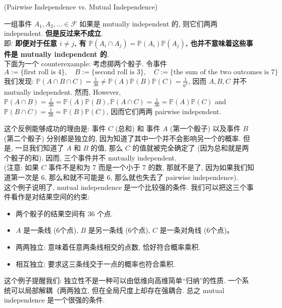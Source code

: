 \begin{example}{(Pairwise Independence vs. Mutual Independence)}

一组事件 $A_1, A_2, \ldots \in \mathcal{F}$ 如果是 mutually independent 的, 则它们两两 independent. \textbf{但是反过来不成立}.\\
即: \textbf{即便对于任意 $i \neq j$, 有 $\mathbb{P}(A_i \cap A_j) = \mathbb{P}(A_i) \mathbb{P}(A_j)$, 也并不意味着这些事件是 mutually independent 的}.\\
下面为一个 counterexample: 考虑掷两个骰子. 令事件
$$
A:=\{\text{first roll is } 4\}, \quad B:=\{\text{second roll is } 3\},\quad C:=\{\text{the sum of the two outcomes is } 7\}
$$
我们发现: $\mathbb{P}(A \cap B \cap C)=\frac{1}{36} \neq \mathbb{P}(A) \mathbb{P}(B) \mathbb{P}(C)=\frac{1}{6^3}$, 因而 $A, B, C$ 并不 mutually independent. 然而, However, $\mathbb{P}(A \cap B)=\frac{1}{36}=\mathbb{P}(A) \mathbb{P}(B), \mathbb{P}(A \cap C)=\frac{1}{36}=\mathbb{P}(A) \mathbb{P}(C)$ and $\mathbb{P}(B \cap C)=\frac{1}{36}=\mathbb{P}(B) \mathbb{P}(C)$, 
因而它们两两 pairwise independent.
\end{example}
\begin{remark}
这个反例能够成功的理由是: 事件 $C$ (总和) 和 事件 $A$ (第一个骰子) 以及事件 $B$ (第二个骰子) 分别都是独立的, 因为知道了其中一个并不会影响另一个的概率. 但是, 一旦我们知道了 $A$ 和 $B$ 的值, 那么 $C$ 的值就被完全确定了 (因为总和就是两个骰子的和). 因而, 三个事件并不 mutually independent. \\
(注意: 如果 \(C\) 事件不是和为 7 而是一个小于 7 的数, 那就不是了, 因为如果我们知道第一次是 6, 那么和就不可能是 6, 那么就也失去了 pairwise independence).\\
这个例子说明了, mutual independence 是一个比较强的条件.
我们可以把这三个事件看作是对结果空间的约束:
\begin{itemize}
    \item 两个骰子的结果空间有 36 个点.
    \item $A$ 是一条线 (6个点), $B$ 是另一条线 (6个点), $C$ 是一条对角线 (6个点)。
    \item 两两独立: 意味着任意两条线相交的点数, 恰好符合概率乘积.
    \item 相互独立: 要求这三条线交于一点的概率也符合乘积. 
\end{itemize}
这个例子提醒我们: 独立性不是一种可以由低维向高维简单“归纳”的性质. 一个系统可以局部解耦（两两独立, 但在全局尺度上却存在强耦合. 总之 mutual independence 是一个很强的条件.
\end{remark}



